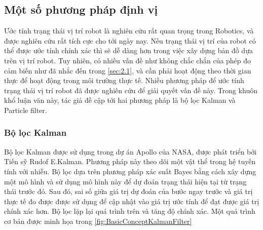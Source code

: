 {{%



\subsection{Một số phương pháp định vị}

Ước tính trạng thái vị trí robot là nghiên cứu rất quan trọng trong Robotics, và được nghiên cứu rất tích cực cho tới ngày nay. Nếu trạng thái vị trí của robot có thể được ước tính chính xác thì sẽ dễ dàng hơn trong việc xây dựng bản đồ dựa trên vị trí robot. Tuy nhiên, có nhiều vấn đề như không chắc chắn của phép đo cảm biến như đã nhắc đến trong \ref{sec:2.1}, và cần phải hoạt động theo thời gian thực để hoạt động trong môi trường thực tế. Nhiều phương pháp để ước tính trạng thái vị trí robot đã được nghiên cứu để giải quyết vấn đề này. Trong khuôn khổ luận văn này, tác giả đề cập tới hai phương pháp là bộ lọc Kalman và Particle filter.

\subsubsection*{Bộ lọc Kalman}
Bộ lọc Kalman được sử dụng trong dự án Apollo của NASA, được phát triển bởi Tiến sỹ Rudof E.Kalman. Phương pháp này theo dõi một vật thể trong hệ tuyến tính với nhiễu. Bộ lọc dựa trên phương pháp xác suất Bayes bằng cách xây dựng một mô hình và sử dụng mô hình này để dự đoán trạng thái hiện tại từ trạng thái trước đó. Sau đó, sai số giữa giá trị dự đoán của bước ngay trước và giá trị thực tế đo được được sử dụng để cập nhật vào giá trị ước tính để đạt được giá trị chính xác hơn. Bộ lọc lặp lại quá trình trên và tăng độ chính xác. Một quá trình cơ bản được minh họa trong \figurename{ \ref{fig:BasicConceptKalmanFilter}}

}}
